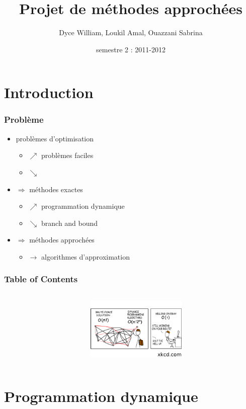 \documentclass[french]{beamer}
\title{Projet de méthodes approchées}
\institute{M1 informatique UM2}
\author{Dyce William, Loukil Amal, Ouazzani Sabrina}
\date{semestre 2 : 2011-2012}
\begin{document}
\begin{frame}
\titlepage
\end{frame}

\section{Introduction}

\begin{frame}
\frametitle{Problème}
\begin{itemize}
\item problèmes d'optimisation 
\begin{itemize}
\item[] $\nearrow$ problèmes faciles
\item[] $\searrow$ 
\end{itemize}
\item  $\Rightarrow$ méthodes exactes 
\begin{itemize}
\item[] $\nearrow$ programmation dynamique
\item[] $\searrow$ branch and bound
\end{itemize}


\item  $\Rightarrow$ méthodes approchées
\begin{itemize}
\item[] $\longrightarrow$ algorithmes d'approximation
\end{itemize}
\end{itemize}
\end{frame}

\begin{frame}
\frametitle{Table of Contents}
\begin{columns}
\begin{column}[]{5cm}
\tableofcontents
\end{column}
\begin{column}[]{4cm}
\includegraphics[height=3cm]{commerce.png}
\end{column}
\end{columns}
\end{frame}

\section{Programmation dynamique}
\end{document}
